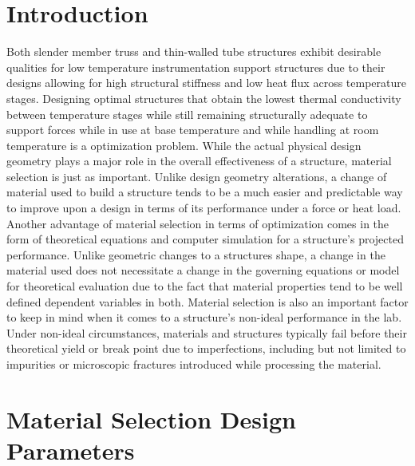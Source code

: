 \documentclass[final]{svjour2}
\begin{document}
\section{Introduction}
Both slender member truss and thin-walled tube structures exhibit desirable qualities for low temperature instrumentation support structures due to their designs allowing for high structural stiffness and low heat flux across temperature stages.  Designing optimal structures that obtain the lowest thermal conductivity between temperature stages while still remaining structurally adequate to support  forces while in use at base temperature and while handling at room temperature is a optimization problem.  While the actual physical design geometry plays a major role in the overall effectiveness of a structure, material selection is just as important.  Unlike design geometry alterations, a change of material used to build a structure tends to be a much easier and predictable way to improve upon a design in terms of its performance under a force or heat load. Another advantage of material selection in terms of optimization comes in the form of theoretical equations and computer simulation for a structure's projected performance.  Unlike geometric changes to a structures shape, a change in the material used does not necessitate a change in the governing equations or model for theoretical evaluation due to the fact that material properties tend to be well defined dependent variables in both.  Material selection is also an important factor to keep in mind when it comes to a structure's non-ideal performance in the lab. Under non-ideal circumstances, materials and structures typically fail before their theoretical yield or break point due to imperfections, including but not limited to impurities or microscopic fractures introduced while processing the material.

\section{Material Selection Design Parameters}
\end{document}
